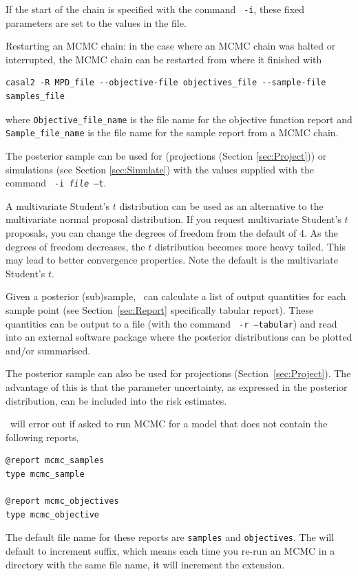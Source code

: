 If  the start of the chain is specified with the command \texttt{\cname\ -i}, these fixed parameters are set to the values in the file.

Restarting an MCMC chain: in the case where an MCMC chain was halted or interrupted, the MCMC chain can be restarted from where it finished with

{\small{\begin{verbatim}
casal2 -R MPD_file --objective-file objectives_file --sample-file samples_file
\end{verbatim}}}

where \texttt{Objective\_file\_name} is the file name for the objective function report and \texttt{Sample\_file\_name} is the file name for the sample report from a MCMC chain.

The posterior sample can be used for (projections (Section \ref{sec:Project})) or simulations (see Section \ref{sec:Simulate}) with the values supplied with the command \texttt{\cname\ -i \emph{file} --t}.

A multivariate Student's $t$ distribution can be used as an alternative to the multivariate normal proposal distribution. If you request multivariate Student's $t$ proposals, you can change the degrees of freedom from the default of 4. As the degrees of freedom decreases, the $t$ distribution becomes more heavy tailed. This may lead to better convergence properties. Note the default is the multivariate Student's $t$.

Given a posterior (sub)sample, \CNAME\ can calculate a list of output quantities for each sample point (see Section~\ref{sec:Report} specifically tabular report). These quantities can be output to a file (with the command \texttt{\cname\ -r --tabular}) and read into an external software package where the posterior distributions can be plotted and/or summarised.

The posterior sample can also be used for projections (Section~\ref{sec:Project}). The advantage of this is that the parameter uncertainty, as expressed in the posterior distribution, can be included into the risk estimates.

\CNAME\ will error out if asked to run MCMC for a model that does not contain the following reports,
{\small{\begin{verbatim}
@report mcmc_samples
type mcmc_sample

@report mcmc_objectives
type mcmc_objective
\end{verbatim}}}

The default file name for these reports are \texttt{samples} and \texttt{objectives}. The  will default to increment suffix, which means each time you re-run an MCMC in a directory with the same file name, it will increment the extension.

